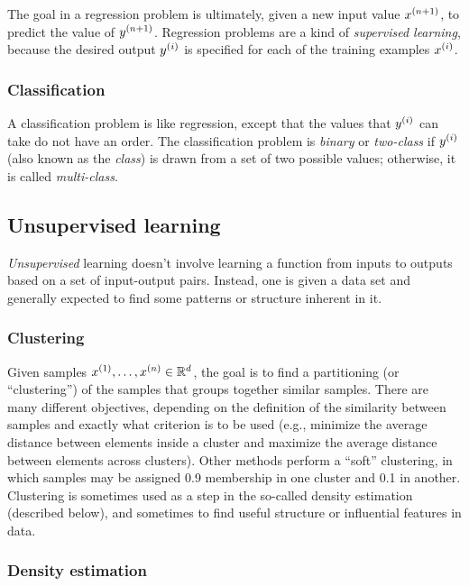 The goal in a regression problem is ultimately, given a new input
value $x^{(n+1)}$, to predict the value of $y^{(n+1)}$.
Regression problems are a kind of {\em supervised learning},
because the desired output $y^{(i)}$ is specified for
each of the training examples $x^{(i)}$.

\subsubsection{Classification}

A classification problem is like regression, except that
the values that $y^{(i)}$ can take do not have an order.
The classification problem is
  {\em binary} or {\em two-class} if $y^{(i)}$ (also known as the {\em class})
is drawn from a set of two possible values; otherwise, it is called
  {\em multi-class}.

\subsection{Unsupervised learning}
\label{sec-intro_unsupervised}

{\em Unsupervised} learning doesn't
involve learning a function from inputs to outputs based on a set of
input-output pairs.  Instead, one is given a data set and generally
expected to find some patterns or structure inherent in it.

\subsubsection{Clustering}

Given samples $x^{(1)}, \ldots, x^{(n)} \in \mathbb{R}^d$, the goal is to
find a partitioning (or ``clustering'') of the samples that groups together similar samples.  There are many different objectives, depending on the
definition of the similarity between samples and exactly what
criterion is to be used (e.g., minimize the average distance between
elements inside a cluster and maximize the average distance between
elements across clusters).  Other methods perform a ``soft''
clustering, in which samples may be assigned 0.9 membership in one
cluster and 0.1 in another.  Clustering is sometimes used as a step in
the so-called density estimation (described below), and sometimes to find useful structure or influential
features in data.


\subsubsection{Density estimation}


